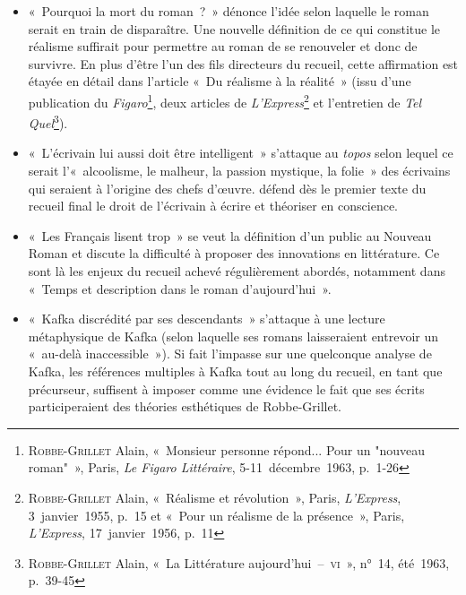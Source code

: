 \begin{itemize}
    \item «~Pourquoi la mort du roman~?~» dénonce l'idée selon laquelle le roman serait en train de disparaître. Une nouvelle définition de ce qui constitue le réalisme suffirait pour permettre au roman de se renouveler et donc de survivre. En plus d'être l'un des fils directeurs du recueil, cette affirmation est étayée en détail dans l'article «~Du réalisme à la réalité~» (issu d'une publication du \textit{Figaro}\footnote{\textsc{Robbe-Grillet} Alain, «~Monsieur personne répond... Pour un "nouveau roman"~», Paris, \textit{Le Figaro Littéraire}, 5-11~décembre~1963, p.~1-26}, deux articles de \textit{L'Express}\footnote{\textsc{Robbe-Grillet} Alain, «~Réalisme et révolution~», Paris, \textit{L'Express}, 3~janvier~1955, p.~15 et «~Pour un réalisme de la présence~», Paris, \textit{L'Express}, 17~janvier~1956, p.~11} et l'entretien de \textit{Tel Quel}\footnote{\textsc{Robbe-Grillet} Alain, «~La Littérature aujourd'hui~–~\textsc{vi}~», n°~14, été~1963, p.~39-45}).
    \item «~L’écrivain lui aussi doit être intelligent~» s'attaque au \textit{topos} selon lequel ce serait l'«~alcoolisme, le malheur, la passion mystique, la folie~» des écrivains qui seraient à l'origine des chefs d'œuvre. \robbe{} défend dès le premier texte du recueil final le droit de l'écrivain à écrire et théoriser en conscience.
    \item «~Les Français lisent trop~» se veut la définition d'un public au Nouveau Roman et discute la difficulté à proposer des innovations en littérature. Ce sont là les enjeux du recueil achevé régulièrement abordés, notamment dans «~Temps et description dans le roman d'aujourd'hui~».
    \item «~Kafka discrédité par ses descendants~» s'attaque à une lecture métaphysique de Kafka (selon laquelle ses romans laisseraient entrevoir un «~au-delà inaccessible~»). Si \punr{} fait l'impasse sur une quelconque analyse de Kafka, les références multiples à Kafka tout au long du recueil, en tant que précurseur, suffisent à imposer comme une évidence le fait que ses écrits participeraient des théories esthétiques de Robbe-Grillet.
\end{itemize}

